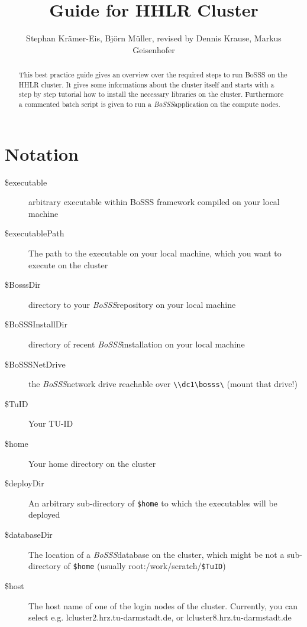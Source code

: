 \documentclass[11pt,twoside,a4paper]{fdyartcl}
\title{Guide for HHLR Cluster}
\author{Stephan Krämer-Eis, Björn Müller, revised by Dennis Krause, Markus Geisenhofer}
\newcommand{\Bosss}{\textit{BoSSS}}
\begin{document}

\setcounter{page}{1} %

\maketitle


\begin{abstract}
This best practice guide gives an overview over the required steps to run BoSSS on the HHLR cluster. It gives some informations about the cluster itself and starts with a step by step tutorial how to install the necessary libraries on the cluster. Furthermore a commented batch script is given to run a \Bosss application on the compute nodes.
\end{abstract}




%
\section{Notation}
\label{sec:notation}
\begin{description}
	\item[\$executable] arbitrary executable within BoSSS framework compiled on your local machine
	\item[\$executablePath] The path to the executable on your local machine, which you want to execute on the cluster
	\item[\$BosssDir] directory to your \Bosss repository on your local machine
	\item[\$BoSSSInstallDir] directory of recent \Bosss installation on your local machine
	\item[\$BoSSSNetDrive] the \Bosss network drive reachable over \verb|\\dc1\bosss\| (mount that drive!)
	\item[\$TuID] Your TU-ID
	\item[\$home] Your home directory on the cluster
	\item[\$deployDir] An arbitrary sub-directory of \verb|$home| to which the executables will be deployed
	\item[\$databaseDir] The location of a \Bosss database on the cluster, which might be not a sub-directory of \verb|$home| (usually root:/work/scratch/\verb|$TuID|)
	\item[\$host] The host name of one of the login nodes of the cluster. Currently, you can select e.g. lcluster2.hrz.tu-darmstadt.de, or lcluster8.hrz.tu-darmstadt.de
\end{description}
\end{document}
